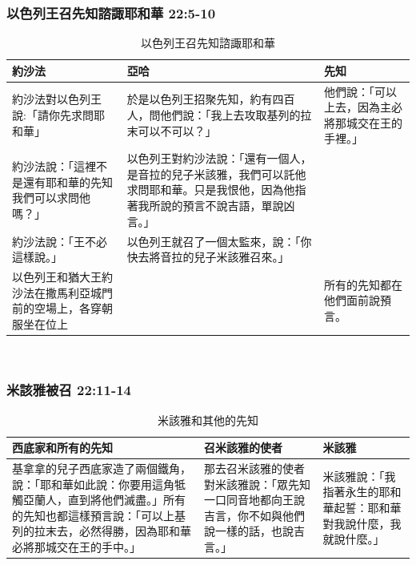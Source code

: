 \subsubsection{以色列王召先知諮諏耶和華 22:5-10}
\begin{table}[H]
\hspace*{-10mm}
\centering 
{}
\begin{tabular}{p{5.75cm}|p{7.75cm}|p{4.25cm}}\hline\hline
約沙法&亞哈&先知\\\hline
約沙法對以色列王說:「請你先求問耶和華」&於是以色列王招聚先知，約有四百人，問他們說：「我上去攻取基列的拉末可以不可以？」&他們說：「可以上去，因為主必將那城交在王的手裡。」\\\hline
約沙法說：「這裡不是還有耶和華的先知我們可以求問他嗎？」&以色列王對約沙法說：「還有一個人，是音拉的兒子米該雅，我們可以託他求問耶和華。只是我恨他，因為他指著我所說的預言不說吉語，單說凶言。」&\\\hline
約沙法說：「王不必這樣說。」&以色列王就召了一個太監來，說：「你快去將音拉的兒子米該雅召來。」 &\\\hline
以色列王和猶大王約沙法在撒馬利亞城門前的空場上，各穿朝服坐在位上&&所有的先知都在他們面前說預言。\\\hline
\end{tabular}
\caption{以色列王召先知諮諏耶和華}
\end{table} 
 
\subsubsection{米該雅被召 22:11-14}
\begin{table}[H]
\hspace*{-10mm}
\centering 
{}
\begin{tabular}{p{8.25cm}|p{4.75cm}|p{}}\hline\hline
西底家和所有的先知&召米該雅的使者&米該雅\\\hline
基拿拿的兒子西底家造了兩個鐵角，說：「耶和華如此說：你要用這角牴觸亞蘭人，直到將他們滅盡。」所有的先知也都這樣預言說：「可以上基列的拉末去，必然得勝，因為耶和華必將那城交在王的手中。」
&那去召米該雅的使者對米該雅說：「眾先知一口同音地都向王說吉言，你不如與他們說一樣的話，也說吉言。」
&米該雅說：「我指著永生的耶和華起誓：耶和華對我說什麼，我就說什麼。」 \\\hline
\end{tabular}
\caption{米該雅和其他的先知}
\end{table} 


